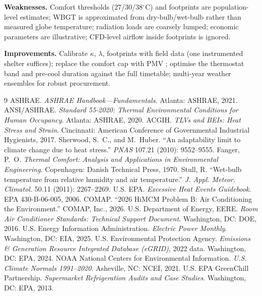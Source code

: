 \documentclass[11pt]{article}
\newcommand{\degrees}{\ensuremath{^\circ}}
\begin{document}
\textbf{Weaknesses.} Comfort thresholds (27/30/38$\degrees$C) and footprints are population-level estimates; WBGT is approximated from dry-bulb/wet-bulb rather than measured globe temperature; radiation loads are coarsely lumped; economic parameters are illustrative; CFD-level airflow inside footprints is ignored.

\textbf{Improvements.} Calibrate $\kappa$, $\lambda$, footprints with field data (one instrumented shelter suffices); replace the comfort cap with PMV \cite{fanger}; optimise the thermostat band and pre-cool duration against the full timetable; multi-year weather ensembles for robust procurement.

\begin{thebibliography}{9}
 ASHRAE. \emph{ASHRAE Handbook---Fundamentals}. Atlanta: ASHRAE, 2021.
 ANSI/ASHRAE. \emph{Standard 55-2020: Thermal Environmental Conditions for Human Occupancy}. Atlanta: ASHRAE, 2020.
 ACGIH. \emph{TLVs and BEIs: Heat Stress and Strain}. Cincinnati: American Conference of Governmental Industrial Hygienists, 2017.
 Sherwood, S.~C., and M.~Huber. ``An adaptability limit to climate change due to heat stress.'' \emph{PNAS} 107.21 (2010): 9552--9555.
 Fanger, P.~O. \emph{Thermal Comfort: Analysis and Applications in Environmental Engineering}. Copenhagen: Danish Technical Press, 1970.
 Stull, R. ``Wet-bulb temperature from relative humidity and air temperature.'' \emph{J. Appl. Meteor. Climatol.} 50.11 (2011): 2267--2269.
 U.S. EPA. \emph{Excessive Heat Events Guidebook}. EPA 430-B-06-005, 2006.
 COMAP. ``2026 HiMCM Problem B: Air Conditioning the Environment.'' COMAP, Inc., 2026.
 U.S. Department of Energy, EERE. \emph{Room Air Conditioner Standards: Technical Support Document}. Washington, DC: DOE, 2016.
 U.S. Energy Information Administration. \emph{Electric Power Monthly}. Washington, DC: EIA, 2025.
 U.S. Environmental Protection Agency. \emph{Emissions \& Generation Resource Integrated Database (eGRID)}, 2022 data. Washington, DC: EPA, 2024.
 NOAA National Centers for Environmental Information. \emph{U.S. Climate Normals 1991--2020}. Asheville, NC: NCEI, 2021.
 U.S. EPA GreenChill Partnership. \emph{Supermarket Refrigeration Audits and Case Studies}. Washington, DC: EPA, 2013.
\end{thebibliography}
\end{document}
